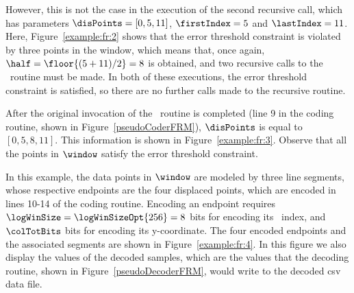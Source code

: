 \clearpage




However, this is not the case in the execution of the second recursive call, which has parameters $\disPoints=[0, 5, 11]$, $\firstIndex = 5$ and $\lastIndex = 11$. Here, Figure~\ref{example:fr:2} shows that the error threshold constraint is violated by three points in the window, which means that, once again, $\half=\floor{(5 + 11) / 2}=8$ is obtained, and two recursive calls to the \getDisplacedPointsMethod\ routine must be made. In both of these executions, the error threshold constraint is satisfied, so there are no further calls made to the recursive routine. 


After the original invocation of the \getDisplacedPointsMethod\ routine is completed (line 9 in the coding routine, shown in Figure~\ref{pseudoCoderFRM}), $\disPoints$ is equal to $[0, 5, 8, 11]$. This information is shown in Figure~\ref{example:fr:3}. Observe that all the points in $\window$ satisfy the error threshold constraint.




In this example, the data points in $\window$ are modeled by three line segments, whose respective endpoints are the four displaced points, which are encoded in lines 10-14 of the coding routine. Encoding an endpoint requires $\logWinSize = \logWinSizeOpt{256}=8$ bits for encoding its \window\ index, and $\colTotBits$ bits for encoding its y-coordinate. The four encoded endpoints and the associated segments are shown in Figure~\ref{example:fr:4}. In this figure we also display the values of the decoded samples, which are the values that the decoding routine, shown in Figure~\ref{pseudoDecoderFRM}, would write to the decoded csv data file. 




\clearpage

